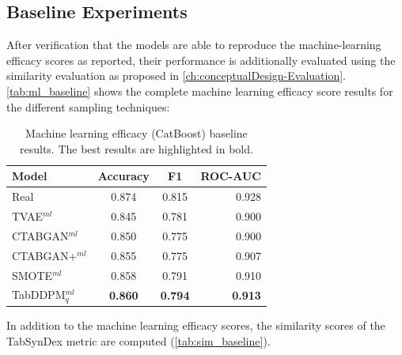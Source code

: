 \subsection{Baseline Experiments}
\label{ch:Baseline}

After verification that the models are able to reproduce the machine-learning efficacy scores as reported,
their performance is additionally evaluated using the similarity evaluation as proposed in \autoref{ch:conceptualDesign-Evaluation}.
\autoref{tab:ml_baseline} shows the complete machine learning efficacy score results for the different sampling techniques:

\begin{table}[h]
	\centering
	\begin{tabular}{lccr}
		\toprule
		\textbf{Model}     & \textbf{Accuracy} & \textbf{F1}    & \textbf{ROC-AUC} \\
		\midrule
		Real               & 0.874              & 0.815          & 0.928            \\
		TVAE$^{ml}$        & 0.845              & 0.781          & 0.900            \\
		CTABGAN$^{ml}$     & 0.850              & 0.775          & 0.900            \\
		CTABGAN+$^{ml}$    & 0.855              & 0.775          & 0.907            \\
		SMOTE$^{ml}$       & 0.858              & 0.791          & 0.910            \\
		TabDDPM$^{ml}_{q}$ & \textbf{0.860}     & \textbf{0.794} & \textbf{0.913}   \\
		\bottomrule
	\end{tabular}
	\caption[ML-efficacy Baseline]{Machine learning efficacy (CatBoost) baseline results. The best results are highlighted in bold.}
	\label{tab:ml_baseline}
\end{table}


In addition to the machine learning efficacy scores, the similarity scores of the TabSynDex metric are computed (\autoref{tab:sim_baseline}).

